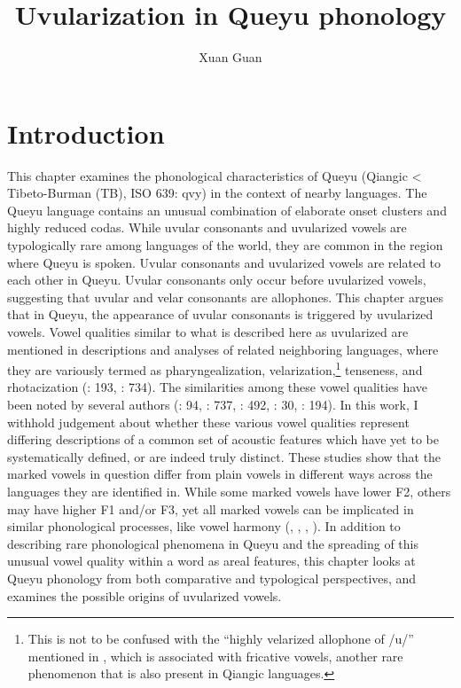 \documentclass[output=paper]{langscibook}
\author{Xuan Guan\orcid{}\affiliation{University of Oregon}}
\title{Uvularization in Queyu phonology}
\begin{document}
\maketitle

\section{Introduction}\label{sec:guan:1}

This chapter examines the phonological characteristics of Queyu (Qiangic < Ti\-beto-Burman (TB), ISO 639: qvy) in the context of nearby languages. The Queyu language contains an unusual combination of elaborate onset clusters and highly reduced codas. While uvular consonants and uvularized vowels are typologically rare among languages of the world, they are common in the region where Queyu is spoken. Uvular consonants and uvularized vowels are related to each other in Queyu. Uvular consonants only occur before uvularized vowels, suggesting that uvular and velar consonants are allophones. This chapter argues that in Queyu, the appearance of uvular consonants is triggered by uvularized vowels. Vowel qualities similar to what is described here as uvularized are mentioned in descriptions and analyses of related neighboring languages, where they are variously termed as pharyngealization, velarization,\footnote{This is not to be confused with the “highly velarized allophone of /u/” mentioned in , which is associated with fricative vowels, another rare phenomenon that is also present in Qiangic languages.} tenseness, and rhotacization (\citealt{Gong2020}: 193, \citealt{Chirkova2024}: 734). The similarities among these vowel qualities have been noted by several authors (\citealt{Evans2006a}: 94, \citealt{Evans2006b}: 737, \citealt{Suzuki2011}: 492, \citealt{Suzuki2013}: 30, \citealt{Gong2020}: 194). In this work, I withhold judgement about whether these various vowel qualities represent differing descriptions of a common set of acoustic features which have yet to be systematically defined, or are indeed truly distinct. These studies show that the marked vowels in question differ from plain vowels in different ways across the languages they are identified in. While some marked vowels have lower F2, others may have higher F1 and/or F3, yet all marked vowels can be implicated in similar phonological processes, like vowel harmony (\citealt{LinEtAl2012}, \citealt{EvansEtAl2016}, \citealt{Way2018}, \citealt{ChiuSun2020}). In addition to describing rare phonological phenomena in Queyu and the spreading of this unusual vowel quality within a word as areal features, this chapter looks at Queyu phonology from both comparative and typological perspectives, and examines the possible origins of uvularized vowels.
\end{document}
